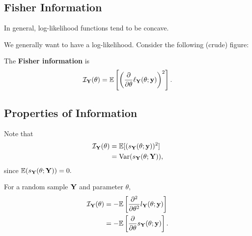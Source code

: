 \subsection{Fisher Information}

\begin{remark}
		In general, log-likelihood functions tend to be concave.
\end{remark}
We generally want to have a log-likelihood. Consider the following (crude) figure:

\begin{definition}
The \textbf{Fisher information} is
$$
\mathcal I_{\YY}(\theta)=\EE\left[\left(\pder{\theta}\ell_\YY(\theta;\yy)\right)^2\right].
$$
\end{definition}

\subsection{Properties of Information}
Note that
\begin{align*}
	\mathcal I_\YY(\theta)&=\EE[(s_{\YY}(\theta;\yy))^2] \\
    &=\Var(s_\YY(\theta;\YY)),
\end{align*}
since $\EE(s_\YY(\theta;\YY))=0.$ 
\begin{prop}
For a random sample $\YY$ and parameter $\theta,$
\begin{align*}
    \mathcal I_\YY(\theta)&=-\EE\left[\pder[^2]{\theta^2}l_\YY(\theta;\yy)\right] \\
    &=-\EE\left[\pder{\theta}{s_\YY(\theta;\yy)}\right].
\end{align*}
\end{prop}

